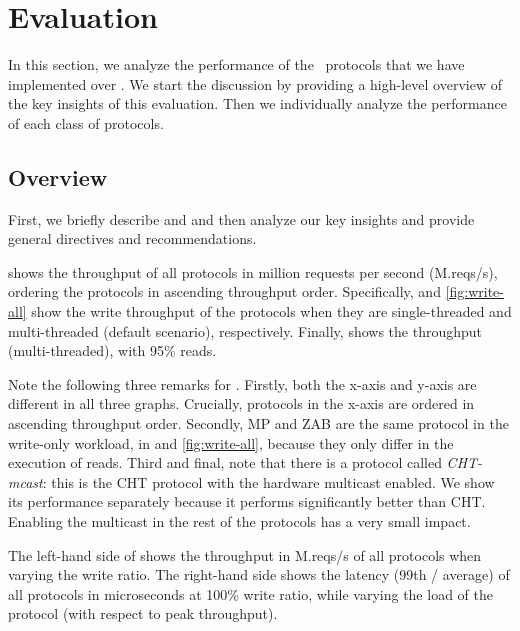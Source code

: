 
\section{Evaluation}
\label{sec:ev}

In this section, we analyze the performance of the \pnum~protocols that we have implemented over \odlib.
We start the discussion by providing a high-level overview of the 
key insights of this evaluation.
Then we individually analyze the performance of each class of protocols. 

\subsection{Overview} 
\label{sec:ev:ov}



First, we briefly describe  and  and then analyze our key insights and provide general directives and recommendations. 

 shows the throughput of all protocols in million requests per second (M.reqs/s), ordering the protocols in ascending throughput order. 
Specifically,  and \ref{fig:write-all} show the write throughput of the protocols when they are single-threaded and multi-threaded (default scenario), respectively.
Finally,  shows the throughput (multi-threaded), with 95\% reads.




Note the following three remarks for .
Firstly, both the x-axis and y-axis are different in all three graphs. Crucially, protocols in the x-axis are ordered in ascending throughput order.
Secondly, MP and ZAB are the same protocol in the write-only workload, \ie in  and \ref{fig:write-all}, because they only differ in the execution of reads.
Third and final, note that there is a protocol called \emph{CHT-mcast}: this is the CHT protocol with the hardware multicast enabled. We show its performance separately because it performs significantly better than CHT. Enabling the multicast in the rest of the protocols has a very small impact. %

The left-hand side of  shows the throughput in M.reqs/s of all protocols when varying the write ratio. 
The right-hand side shows the latency (99th / average) of all protocols in microseconds at 100\% write ratio, while varying the load of the protocol (\ie with respect to peak throughput). 

